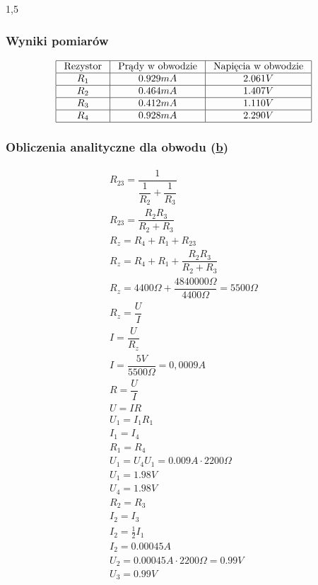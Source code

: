 \documentclass[polish,polish,a4paper]{article}
\begin{document}
\begin{spacing}{1,5}
		\subsubsection*{Wyniki pomiarów}
		
		\begin{equation*}
		\begin{array}{|c|c|c|}
		\hline
		$ Rezystor $&$ Prądy w obwodzie $&$ Napięcia w obwodzie $\\
		\hline
		R_{1}&0.929mA&2.061V\\
		\hline
		R_{2}&0.464mA&1.407V\\
		\hline
		R_{3}&0.412mA&1.110V\\
		\hline
		R_{4}&0.928mA&2.290V\\
		\hline
		\end{array}
		\end{equation*}
		
				\subsubsection*{Obliczenia analityczne dla obwodu (\hyperref[eq:ob2b]{b})}
		
		\begin{gather*}
		R_{23} = \dfrac{1}{\dfrac{1}{R_{2}} + \dfrac{1}{R_{3}}}\\
		R_{23} = \dfrac{R_{2}R_{3}}{R_{2}+R_{3}}\\
		R_{z} = R_{4} + R_{1} + R_{23}\\
		R_{z} = R_{4} + R_{1} + \dfrac{R_{2}R_{3}}{R_{2}+R_{3}}\\
		R_{z} = 4400\Omega + \dfrac{4840000\Omega}{4400\Omega}	 = 5500\Omega\\
		R_{z} = \dfrac{U}{I}	\\
		I = \dfrac{U}{R_{z}}\\
		I = \dfrac{5V}{5500\Omega} = 0,0009A\\
		R = \dfrac{U}{I}\\
		U = IR\\
		U_{1} = I_{1}R_{1}\\
		I_{1} = I_{4}\\
		R_{1} = R_{4}\\
		U_{1} = U_{4}
		U_{1} = 0.009A \cdot 2200\Omega\\
		U_{1} = 1.98V\\
		U_{4} = 1.98V\\
		R_{2} = R_{3}\\
		I_{2} = I_{3}\\
		I_{2} = \frac{1}{2}I_{1}\\
		I_{2} = 0.00045A\\
		U_{2} = 0.00045A \cdot 2200\Omega = 0.99V\\
		U_{3} = 0.99V
		\end{gather*}
		

\end{spacing}
\end{document}

